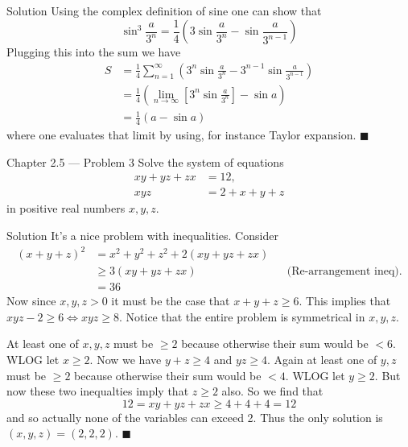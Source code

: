 \documentclass{article}
\begin{document}
\begin{solution}{Solution}
Using the complex definition of sine one can show that
$$
\sin^3 \frac{a}{3^n} =
\frac14 \left( 3\sin \frac{a}{3^n} - \sin \frac{a}{3^{n-1}} \right)
$$
Plugging this into the sum we have
\[
\begin{aligned}
S &= \frac14 \sum_{n=1}^\infty
\left(
3^n \sin \frac{a}{3^n} - 3^{n-1} \sin \frac{a}{3^{n-1}}
\right) \\
&= \frac14
\left(
\lim_{n\rightarrow \infty} \left[ 3^n \sin \frac{a}{3^n} \right] - \sin a
\right) \\
&= \frac14
\left(
a - \sin a
\right)
\end{aligned}
\]
where one evaluates that limit by using, for instance Taylor expansion.
$\blacksquare$
\end{solution}
\newpage

\begin{problem}{Chapter 2.5 --- Problem 3}
Solve the system of equations
\[
\begin{aligned}
xy + yz + zx &= 12, \\
xyz &= 2 + x + y + z
\end{aligned}
\]
in positive real numbers $x,y,z$.
\end{problem}

\begin{solution}{Solution}
It's a nice problem with inequalities. Consider
\[
\begin{aligned}
(x+y+z)^2 &= x^2 + y^2 + z^2 + 2(xy + yz + zx) \\
&\geq 3(xy + yz + zx) && \text{(Re-arrangement ineq).} \\
&= 36
\end{aligned}
\]
Now since $x,y,z > 0$ it must be the case that $x + y + z \geq 6$.
This implies that $xyz - 2 \geq 6 \iff xyz \geq 8$. Notice that the
entire problem is symmetrical in $x,y,z$.
\vspace{0.2cm}

At least one of
$x,y,z$ must be $\geq 2$ because otherwise their sum would be $< 6$.
WLOG let $x \geq 2$. Now we have
$y + z \geq 4$ and $yz \geq 4$. Again at least one of $y,z$ must be $\geq 2$
because otherwise their sum would be $ < 4$. WLOG let $y \geq 2$. But now
these two inequalties imply that $z \geq 2$ also. So we find that
$$
12 = xy + yz + zx \geq 4 + 4 + 4 = 12
$$
and so actually none of the variables can exceed 2. Thus the only solution
is $(x,y,z) = (2,2,2)$. $\blacksquare$
\end{solution}
\newpage
\end{document}
